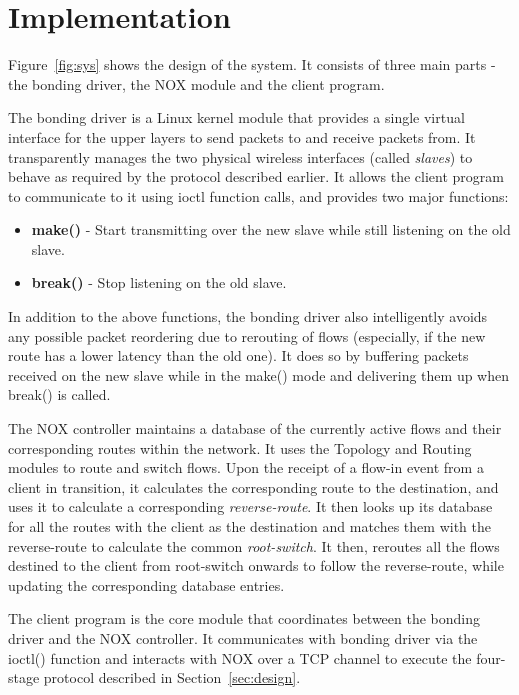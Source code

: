 \section{Implementation}\label{impl}

Figure~\ref{fig:sys} shows the design of the \sys{} system. It consists of three main parts - 
the bonding driver, the NOX module and the client program.

The bonding driver is a Linux kernel module that provides a single virtual interface for the upper 
layers to send packets to and receive packets from. 
It transparently manages the two physical wireless interfaces (called \emph{slaves})
to behave as required by the protocol described earlier.
It allows the client program to communicate to it using ioctl function calls, 
and provides two major functions:

\begin{itemize}
\item {\bf make()} - Start transmitting over the new slave while 
still listening on the old slave.
\item {\bf break()} - Stop listening on the old slave.
\end{itemize}

In addition to the above functions, the bonding driver also intelligently avoids 
any possible packet reordering due to rerouting of flows (especially, if the new
route has a lower latency than the old one). It does so by buffering packets received
on the new slave while in the make() mode and delivering them up when break() is called.

The NOX controller maintains a database of the currently active flows and their 
corresponding routes within the network.
It uses the Topology and Routing modules to route and switch flows.
Upon the receipt of a flow-in event from a client in transition, it calculates the corresponding route
to the destination, and uses it to calculate a corresponding \emph{reverse-route}. It then looks up
its database for all the routes with the client as the destination and matches them 
with the reverse-route to calculate the common \emph{root-switch}. It then, reroutes all the
flows destined to the client from root-switch onwards to follow the reverse-route, while updating the 
corresponding database entries.

The client program is the core module that coordinates between the bonding driver and the NOX
controller.
It communicates with bonding driver via the ioctl() function and interacts with NOX over a TCP channel
to execute the four-stage protocol described in Section~\ref{sec:design}.

